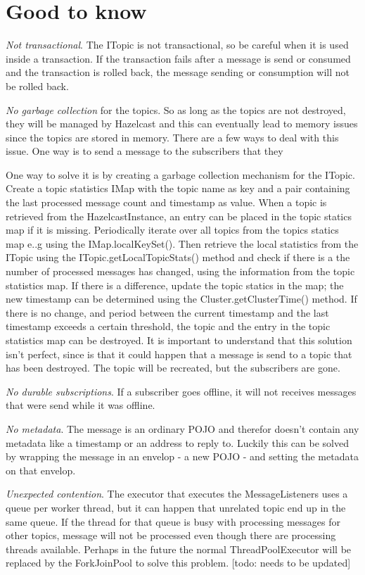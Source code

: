 \section{Good to know}

\emph{Not transactional}. The ITopic is not transactional, so be careful when it is used inside a transaction. If the transaction fails after a message is send or consumed and the transaction is rolled back, the message sending or consumption will not be rolled back.

\emph{No garbage collection} for the topics. So as long as the topics are not destroyed, they will be managed by Hazelcast and this can eventually lead to memory issues since the topics are stored in memory. There are a few ways to deal with this issue. One way is to send a message to the subscribers that they 

One way to solve it is by creating a garbage collection mechanism for the ITopic. Create a topic statistics IMap with the topic name as key and a pair containing the last processed message count and timestamp as value. When a topic is retrieved from the HazelcastInstance, an entry can be placed in the topic statics map if it is missing. Periodically iterate over all topics from the topics statics map e..g using the IMap.localKeySet(). Then retrieve the local statistics from the ITopic using the ITopic.getLocalTopicStats() method and check if there is a the number of processed messages has changed, using the information from the topic statistics map. If there is a difference, update the topic statics in the map; the new timestamp can be determined using the Cluster.getClusterTime() method. If there is no change, and period between the current timestamp and the last timestamp exceeds a certain threshold, the topic and the entry in the topic statistics map can be destroyed. It is important to understand that this solution isn't perfect, since is that it could happen that a message is send to a topic that has been destroyed. The topic will be recreated, but the subscribers are gone.

\emph{No durable subscriptions}. If a subscriber goes offline, it will not receives messages that were send while it was offline.

\emph{No metadata}. The message is an ordinary POJO and therefor doesn't contain any metadata like a timestamp or an address to reply to. Luckily this can be solved by wrapping the message in an envelop - a new POJO - and setting the metadata on that envelop.

\emph{Unexpected contention}. The executor that executes the MessageListeners uses a queue per worker thread, but it can happen that unrelated topic end up in the same queue. If the thread for that queue is busy with processing messages for other topics, message will not be processed even though there are processing threads available. Perhaps in the future the normal ThreadPoolExecutor will be replaced by the ForkJoinPool to solve this problem. [todo: needs to be updated]


